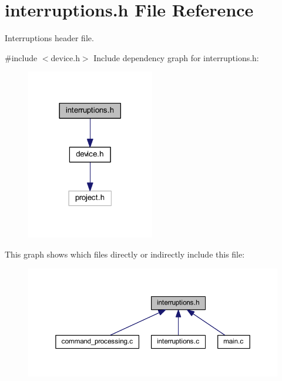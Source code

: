 \section{interruptions.\+h File Reference}
\label{interruptions_8h}


Interruptions header file.  


{\ttfamily \#include $<$device.\+h$>$}\newline
Include dependency graph for interruptions.\+h\+:\nopagebreak
\begin{figure}[H]
\begin{center}
\leavevmode
\includegraphics[width=158pt]{interruptions_8h__incl}
\end{center}
\end{figure}
This graph shows which files directly or indirectly include this file\+:\nopagebreak
\begin{figure}[H]
\begin{center}
\leavevmode
\includegraphics[width=350pt]{interruptions_8h__dep__incl}
\end{center}
\end{figure}

